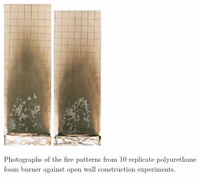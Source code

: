\documentclass[twoside]{uocthesis}
\begin{document}
{\begin{figure}[p]
	\includegraphics[width=1.0in]{../Figures/GBPUF9_IMG_9446}
	\includegraphics[width=1.0in]{../Figures/GBPUF10_IMG_9461} \\

	\caption[Photographs of the fire patterns from 10 replicate polyurethane foam burner against open wall construction experiments.]{Photographs of the fire patterns from 10 replicate polyurethane foam burner against open wall construction experiments.}
	\label{PUF_Open_Wall}
\end{figure}

}
\end{document}
